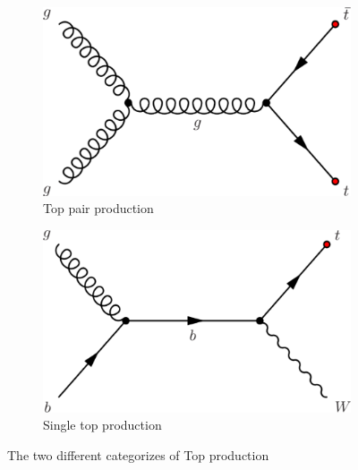 \begin{figure}[H]
\begin{subfigure}{.5\textwidth}
  \centering
  \includegraphics[width=.8\linewidth]{figs/TopPairProduction.png}
  \caption{Top pair production }
  \label{fig:PairProduction}
\end{subfigure}%
\begin{subfigure}{.5\textwidth}
  \centering
  \includegraphics[width=.8\linewidth]{figs/SingleTopProduction.png}
  \caption{Single top production}
  \label{fig:SingleTopProduction}
\end{subfigure}
\caption{The two different categorizes of Top production}
\label{fig:TopProduction}
\end{figure}

